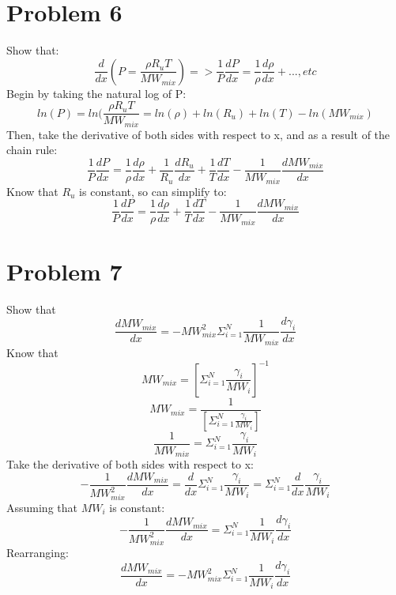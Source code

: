 \documentclass{article}
\begin{document}
\section*{Problem 6}
Show that:
$$\frac{d}{dx}\left(P=\frac{\rho R_u T}{MW_{mix}}\right) => \frac{1}{P}\frac{dP}{dx}=\frac{1}{\rho}\frac{d\rho}{dx}+..., etc$$
Begin by taking the natural log of P:
$$ln(P)=ln(\frac{\rho R_u T}{MW_{mix}}=ln(\rho)+ln(R_u)+ln(T)-ln(MW_{mix})$$
Then, take the derivative of both sides with respect to x, and as a result of the chain rule:
$$\frac{1}{P}\frac{dP}{dx}=\frac{1}{\rho}\frac{d\rho}{dx}+\frac{1}{R_u}\frac{dR_u}{dx}+\frac{1}{T}\frac{dT}{dx}-\frac{1}{MW_{mix}}\frac{dMW_{mix}}{dx}$$
Know that $R_u$ is constant, so can simplify to:
$$\frac{1}{P}\frac{dP}{dx}=\frac{1}{\rho}\frac{d\rho}{dx}+\frac{1}{T}\frac{dT}{dx}-\frac{1}{MW_{mix}}\frac{dMW_{mix}}{dx}$$

\section*{Problem 7}
Show that
$$\frac{dMW_{mix}}{dx}=-MW_{mix}^2\Sigma_{i=1}^N\frac{1}{MW_{mix}}\frac{d\gamma_i}{dx}$$
Know that
$$MW_{mix}=\left[\Sigma_{i=1}^N\frac{\gamma_i}{MW_i}\right]^{-1}$$
$$MW_{mix}=\frac{1}{\left[\Sigma_{i=1}^N\frac{\gamma_i}{MW_i}\right]}$$
$$\frac{1}{MW_{mix}}=\Sigma_{i=1}^N\frac{\gamma_i}{MW_i}$$
Take the derivative of both sides with respect to x:
$$-\frac{1}{MW_{mix}^2}\frac{dMW_{mix}}{dx}=\frac{d}{dx}\Sigma_{i=1}^N\frac{\gamma_i}{MW_i}=\Sigma_{i=1}^N\frac{d}{dx}\frac{\gamma_i}{MW_i}$$
Assuming that $MW_i$ is constant:
$$-\frac{1}{MW_{mix}^2}\frac{dMW_{mix}}{dx}=\Sigma_{i=1}^N\frac{1}{MW_i}\frac{d\gamma_i}{dx}$$
Rearranging:
$$\frac{dMW_{mix}}{dx}=-{MW_{mix}^2}\Sigma_{i=1}^N\frac{1}{MW_i}\frac{d\gamma_i}{dx}$$
\end{document}
